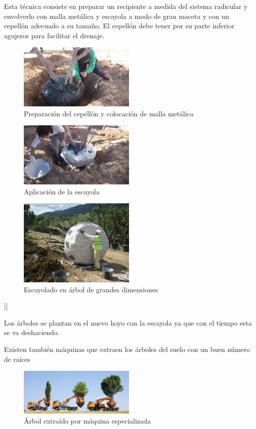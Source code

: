 \documentclass[a4paper,12pt,oneside]{article}
\begin{document}
\begin{enumerate}
\begin{enumerate}
Esta técnica consiste en preparar un recipiente a medida del sistema radicular y
envolverlo con malla metálica y escayola a modo de gran maceta y con un cepellón
adecuado a su tamaño. El cepellón debe tener por su parte inferior agujeros para
facilitar el drenaje. 
\begin{figure}[htbp]
\centering
\includegraphics[width=0.5\textwidth]{./img_uf1596/escayolado_1.jpg}
\caption{Preparación del cepellón y colocación de malla metálica}
\end{figure}
\begin{figure}[htbp]
\centering
\includegraphics[width=0.5\textwidth]{./img_uf1596/escayolado_2.jpg}
\caption{Aplicación de la escayola}
\end{figure}
\begin{figure}[htbp]
\centering
\includegraphics[width=0.5\textwidth]{./img_uf1596/escayolado_3.jpg}
\caption{Escayolado en árbol de grandes dimensiones}
\end{figure}]]

Los árboles se plantan en el nuevo hoyo con la escayola ya que con el tiempo
esta se va deshaciendo.

Existen también máquinas que extraen los árboles del suelo con un buen número de
raíces  

\begin{figure}[htbp]
\centering
\includegraphics[width=0.5\textwidth]{./img_uf1596/arbol_transplante_maquina.jpg}
\caption{Árbol extraído por máquina especializada}
\end{figure}
\end{enumerate}
\end{enumerate}
\end{document}
